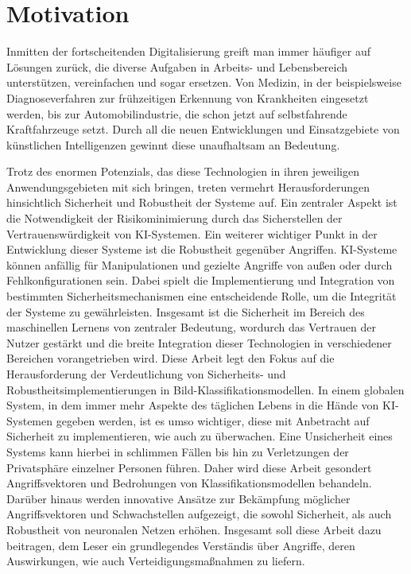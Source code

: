 \section{Motivation} \label{chpt:Einleitung_Motivation}

Inmitten der fortscheitenden Digitalisierung greift man immer häufiger auf Lösungen zurück, die diverse Aufgaben in Arbeits- und Lebensbereich unterstützen, vereinfachen und sogar ersetzen. Von Medizin, in der beispielsweise Diagnoseverfahren zur frühzeitigen Erkennung von Krankheiten eingesetzt werden, bis zur Automobilindustrie, die schon jetzt auf selbstfahrende Kraftfahrzeuge setzt. Durch all die neuen Entwicklungen und Einsatzgebiete von künstlichen Intelligenzen gewinnt diese unaufhaltsam an Bedeutung.

Trotz des enormen Potenzials, das diese Technologien in ihren jeweiligen Anwendungsgebieten mit sich bringen, treten vermehrt Herausforderungen hinsichtlich Sicherheit und Robustheit der Systeme auf. Ein zentraler Aspekt ist die Notwendigkeit der Risikominimierung durch das Sicherstellen der Vertrauenswürdigkeit von KI-Systemen.
Ein weiterer wichtiger Punkt in der Entwicklung dieser Systeme ist die Robustheit gegenüber Angriffen. KI-Systeme können anfällig für Manipulationen und gezielte Angriffe von außen oder durch Fehlkonfigurationen sein. Dabei spielt die Implementierung und Integration von bestimmten Sicherheitsmechanismen eine entscheidende Rolle, um die Integrität der Systeme zu gewährleisten.
Insgesamt ist die Sicherheit im Bereich des maschinellen Lernens von zentraler Bedeutung, wordurch das Vertrauen der Nutzer gestärkt und die breite Integration dieser Technologien in verschiedener Bereichen vorangetrieben wird.
Diese Arbeit legt den Fokus auf die Herausforderung der Verdeutlichung  von Sicherheits- und Robustheitsimplementierungen in Bild-Klassifikationsmodellen. In einem globalen System, in dem immer mehr Aspekte des täglichen Lebens in die \glqq Hände\grqq{} von KI-Systemen gegeben werden, ist es umso wichtiger, diese mit Anbetracht auf Sicherheit zu implementieren, wie auch zu überwachen. Eine Unsicherheit eines Systems kann hierbei in schlimmen Fällen bis hin zu Verletzungen der Privatsphäre einzelner Personen führen. Daher wird diese Arbeit gesondert  Angriffsvektoren und Bedrohungen von Klassifikationsmodellen behandeln.
Darüber hinaus werden innovative Ansätze zur Bekämpfung möglicher Angriffsvektoren und Schwachstellen aufgezeigt, die sowohl Sicherheit, als auch Robustheit von neuronalen Netzen erhöhen. Insgesamt soll diese Arbeit dazu beitragen, dem Leser ein grundlegendes Verständis über Angriffe, deren Auswirkungen, wie auch Verteidigungsmaßnahmen zu liefern. 

